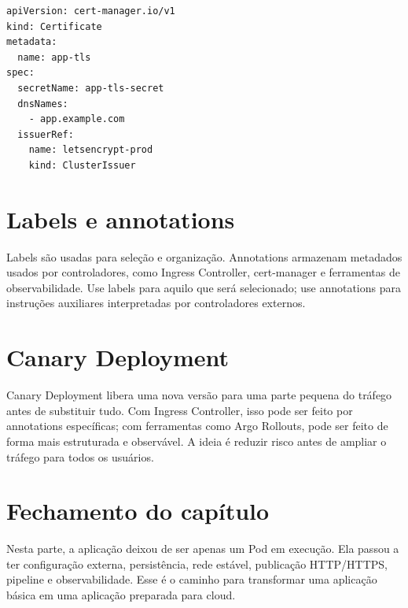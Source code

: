 \documentclass[11pt,a4paper]{article}
\begin{document}
\begin{lstlisting}[language=bash]
apiVersion: cert-manager.io/v1
kind: Certificate
metadata:
  name: app-tls
spec:
  secretName: app-tls-secret
  dnsNames:
    - app.example.com
  issuerRef:
    name: letsencrypt-prod
    kind: ClusterIssuer
\end{lstlisting}

\section*{\color{primary}Labels e annotations}

Labels são usadas para seleção e organização. Annotations armazenam metadados usados por controladores, como Ingress Controller, cert-manager e ferramentas de observabilidade. Use labels para aquilo que será selecionado; use annotations para instruções auxiliares interpretadas por controladores externos.

\section*{\color{primary}Canary Deployment}

Canary Deployment libera uma nova versão para uma parte pequena do tráfego antes de substituir tudo. Com Ingress Controller, isso pode ser feito por annotations específicas; com ferramentas como Argo Rollouts, pode ser feito de forma mais estruturada e observável. A ideia é reduzir risco antes de ampliar o tráfego para todos os usuários.

\section*{\color{primary}Fechamento do capítulo}

Nesta parte, a aplicação deixou de ser apenas um Pod em execução. Ela passou a ter configuração externa, persistência, rede estável, publicação HTTP/HTTPS, pipeline e observabilidade. Esse é o caminho para transformar uma aplicação básica em uma aplicação preparada para cloud.
\end{document}
